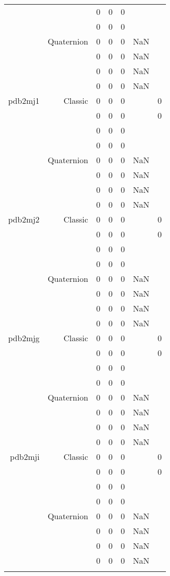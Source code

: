 \begin{xltabular}{\textwidth}{r|rcccSc}
& & 0 & 0 & 0 & & \\
& & 0 & 0 & 0 & & \\
& Quaternion & 0 & 0 & 0 & NaN & \\
& & 0 & 0 & 0 & NaN & \\
& & 0 & 0 & 0 & NaN & \\
& & 0 & 0 & 0 & NaN & \\ \addlinespace
pdb2mj1 & Classic & 0 & 0 & 0 & & 0 \\
& & 0 & 0 & 0 & & 0 \\
& & 0 & 0 & 0 & & \\
& & 0 & 0 & 0 & & \\
& Quaternion & 0 & 0 & 0 & NaN & \\
& & 0 & 0 & 0 & NaN & \\
& & 0 & 0 & 0 & NaN & \\
& & 0 & 0 & 0 & NaN & \\ \addlinespace
pdb2mj2 & Classic & 0 & 0 & 0 & & 0 \\
& & 0 & 0 & 0 & & 0 \\
& & 0 & 0 & 0 & & \\
& & 0 & 0 & 0 & & \\
& Quaternion & 0 & 0 & 0 & NaN & \\
& & 0 & 0 & 0 & NaN & \\
& & 0 & 0 & 0 & NaN & \\
& & 0 & 0 & 0 & NaN & \\ \addlinespace
pdb2mjg & Classic & 0 & 0 & 0 & & 0 \\
& & 0 & 0 & 0 & & 0 \\
& & 0 & 0 & 0 & & \\
& & 0 & 0 & 0 & & \\
& Quaternion & 0 & 0 & 0 & NaN & \\
& & 0 & 0 & 0 & NaN & \\
& & 0 & 0 & 0 & NaN & \\
& & 0 & 0 & 0 & NaN & \\ \addlinespace
pdb2mji & Classic & 0 & 0 & 0 & & 0 \\
& & 0 & 0 & 0 & & 0 \\
& & 0 & 0 & 0 & & \\
& & 0 & 0 & 0 & & \\
& Quaternion & 0 & 0 & 0 & NaN & \\
& & 0 & 0 & 0 & NaN & \\
& & 0 & 0 & 0 & NaN & \\
& & 0 & 0 & 0 & NaN & \\ \addlinespace

\end{xltabular}
